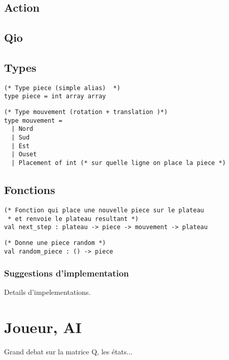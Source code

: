 \documentclass{article}
\begin{document}
\subsection{Action}

\subsection{Qio}


\subsection{Types}


\begin{lstlisting}[frame=L]
(* Type piece (simple alias)  *)
type piece = int array array
\end{lstlisting}

\begin{lstlisting}[frame=L]
(* Type mouvement (rotation + translation )*)
type mouvement =
  | Nord
  | Sud
  | Est
  | Ouset
  | Placement of int (* sur quelle ligne on place la piece *)
\end{lstlisting}

\subsection{Fonctions}


\begin{lstlisting}[frame=L]
(* Fonction qui place une nouvelle piece sur le plateau
 * et renvoie le plateau resultant *)
val next_step : plateau -> piece -> mouvement -> plateau
\end{lstlisting}

\begin{lstlisting}[frame=L]
(* Donne une piece random *)
val random_piece : () -> piece
\end{lstlisting}

\subsubsection{Suggestions d'implementation}

Details d'impelementations.

\section{Joueur, AI}

Grand debat sur la matrice Q, les états...
\end{document}
